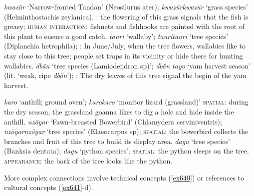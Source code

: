 \sloppy
\begin{exe}
\ex \label{ex631}
	\begin{xlist}
		\ex \label{ex632} \emph{kwazür} `Narrow-fronted Tandan' (Neosilurus ater); \emph{kwazürkwazür} `grass species' (Helminthostachis zeylanica). \textsc{:} the flowering of this grass signals that the fish is greasy; \textsc{human interaction:} fishnets and fishhooks are painted with the root of this plant to ensure a good catch.
		\ex \label{ex633} \emph{tauri} `wallaby'; \emph{tauritauri} `tree species' (Diplanchia hetrophila); \textsc{:} In June/July, when the tree flowers, wallabies like to stay close to this tree; people set traps in its vicinity or hide there for hunting wallabies.
		\ex \label{ex634} \emph{dbän} `tree species (Lamiodendron sp)'; \emph{dbän tayo} `yam harvest season' (lit. `weak, ripe \emph{dbän}'); \textsc{:} The dry leaves of this tree signal the begin of the yam harvest.
	\end{xlist}
\end{exe}%
\begin{exe}
\ex \label{ex635}
	\begin{xlist}
		\ex \label{ex636} \emph{karo} `anthill; ground oven'; \emph{karokaro} `monitor lizard (grassland)' \textsc{spatial:} during the dry season, the grassland goanna likes to dig a hole and hide inside the anthill.
		\ex \label{ex637} \emph{nzöyar} `Fawn-breasted Bowerbird' (Chlamydera cerviniventris); \emph{nzöyarnzöyar} `tree species' (Elaeocarpus sp); \textsc{spatial:} the bowerbird collects the branches and fruit of this tree to build its display area.
		\ex \label{ex638} \emph{dagu} `tree species' (Banksia dentata); \emph{dagu} `python species'; \textsc{spatial:} the python sleeps on the tree. \textsc{appearance:} the bark of the tree looks like the python.
	\end{xlist}
\end{exe}%
\fussy 

More complex connections involve technical concepts (\ref{ex640}) or references to cultural concepts (\ref{ex641}-d).

